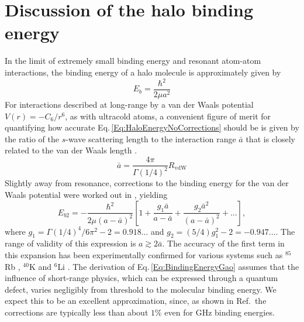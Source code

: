 \section{Discussion of the halo binding energy} \label{sec:lowE_alt}
In the limit of extremely small binding energy and resonant atom-atom interactions, the binding energy of a halo molecule is approximately given by \cite{Kohler2006, hle57, Chin2010}
\begin{equation} \label{Eq:HaloEnergyNoCorrections}
	E_b=\frac{\hbar^2}{2\mu a^2}
\end{equation}
For interactions described at long-range by a van der Waals potential $V(r)=-C_6/r^6$, as with ultracold atoms, a convenient figure of merit for quantifying how accurate Eq.\,\ref{Eq:HaloEnergyNoCorrections} should be is given by the ratio of the $s$-wave scattering length to the interaction range $\bar{a}$ that is closely related to the van der Waals length \cite{gfl93,cju05}.
\begin{equation} \label{Eq:InteractionRangevdW}
  \bar{a} = \frac{4 \pi}{\Gamma(1/4)^2}R_\mathrm{vdW}
\end{equation}
Slightly away from resonance, corrections to the binding energy for the van der Waals potential were worked out in \cite{Gao01,gao04}, yielding
\begin{equation} \label{Eq:BindingEnergyGao}
	E_{b2}=-\frac{\hbar^2}{2\mu(a-\bar{a})^2}\left[1+\frac{g_1\bar{a}}{a-\bar{a}}+\frac{g_2\bar{a}^2}{(a-\bar{a})^2} + ... \right],
\end{equation}
where $g_1=\Gamma(1/4)^4/6\pi^2-2=0.918...$ and $g_2=(5/4)g_1^2-2=-0.947...$. 
The range of validity of this expression is $a \gtrsim 2 \bar{a}$.
The accuracy of the first term in this expansion has been experimentally confirmed for various systems such as $^{85}$Rb \cite{ckt03,kgb03}, $^{40}$K \cite{rtb03,msg05} and $^{6}$Li \cite{bar05}.
The derivation of Eq.\,\ref{Eq:BindingEnergyGao} assumes that the influence of short-range physics, which can be expressed through a quantum defect, varies negligibly from threshold to the molecular binding energy.
We expect this to be an excellent approximation, since, as shown in Ref.\,\cite{Gao01} the corrections are typically less than about $1\%$ even for GHz binding energies.

